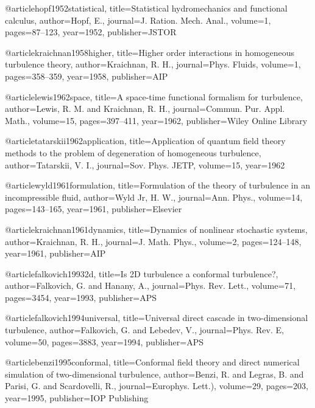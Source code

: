 
  @article{hopf1952statistical,
    title={{Statistical hydromechanics and functional calculus}},
    author={Hopf, E.},
    journal={J. Ration. Mech. Anal.},
    volume={1},
    pages={87--123},
    year={1952},
    publisher={JSTOR}
  }

  @article{kraichnan1958higher,
    title={{Higher order interactions in homogeneous turbulence theory}},
    author={Kraichnan, R. H.},
    journal={Phys. Fluids},
    volume={1},
    pages={358--359},
    year={1958},
    publisher={AIP}
  }

  @article{lewis1962space,
    title={{A space-time functional formalism for turbulence}},
    author={Lewis, R. M. and Kraichnan, R. H.},
    journal={Commun. Pur. Appl. Math.},
    volume={15},
    pages={397--411},
    year={1962},
    publisher={Wiley Online Library}
  }

  @article{tatarskii1962application,
    title={{Application of quantum field theory methods to the problem of degeneration of homogeneous turbulence}},
    author={Tatarskii, V. I.},
    journal={Sov. Phys. JETP},
    volume={15},
    year={1962}
  }

  @article{wyld1961formulation,
    title={{Formulation of the theory of turbulence in an incompressible fluid}},
    author={Wyld Jr, H. W.},
    journal={Ann. Phys.},
    volume={14},
    pages={143--165},
    year={1961},
    publisher={Elsevier}
  }

  @article{kraichnan1961dynamics,
    title={{Dynamics of nonlinear stochastic systems}},
    author={Kraichnan, R. H.},
    journal={J. Math. Phys.},
    volume={2},
    pages={124--148},
    year={1961},
    publisher={AIP}
  }

  @article{falkovich19932d,
  title={{Is 2D turbulence a conformal turbulence?}},
  author={Falkovich, G. and Hanany, A.},
  journal={Phys. Rev. Lett.},
  volume={71},
  pages={3454},
  year={1993},
  publisher={APS}
  }

  @article{falkovich1994universal,
  title={{Universal direct cascade in two-dimensional turbulence}},
  author={Falkovich, G. and Lebedev, V.},
  journal={Phys. Rev. E},
  volume={50},
  pages={3883},
  year={1994},
  publisher={APS}
  }

  @article{benzi1995conformal,
  title={{Conformal field theory and direct numerical simulation of two-dimensional turbulence}},
  author={Benzi, R. and Legras, B. and Parisi, G. and Scardovelli, R.},
  journal={Europhys. Lett.)},
  volume={29},
  pages={203},
  year={1995},
  publisher={IOP Publishing}
  }

